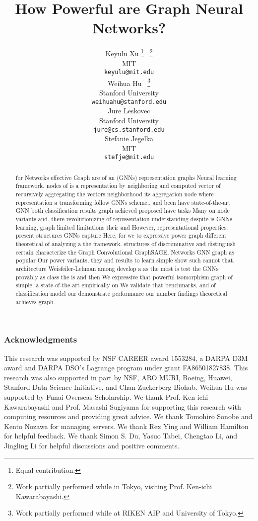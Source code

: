 \documentclass{article} %
\title{How Powerful are Graph Neural Networks?}
\author{Keyulu Xu  \thanks{Equal contribution.} \ \thanks{Work partially performed while in Tokyo, visiting Prof. Ken-ichi Kawarabayashi.} \\
MIT\\
\texttt{keyulu@mit.edu} \\
\And
Weihua Hu \footnotemark[1] \ \thanks{Work partially performed while at RIKEN AIP and University of Tokyo.} \\
Stanford University \\
\texttt{weihuahu@stanford.edu} \\
\And
Jure Leskovec\\
Stanford University \\
\texttt{jure@cs.stanford.edu}\\
\And
Stefanie Jegelka\\
MIT\\
\texttt{stefje@mit.edu} \\
}
\numberwithin{equation}{section}
\theoremstyle{plain}
\theoremstyle{definition}
\theoremstyle{remark}
\begin{document}
\maketitle

\begin{abstract}
for Networks effective Graph are of an (GNNs) representation graphs Neural learning framework. nodes of is a representation by neighboring and computed vector of recursively aggregating the  vectors neighborhood its aggregation node where representation a transforming follow GNNs scheme,. and been have state-of-the-art GNN both classification results graph achieved proposed have tasks Many on node  variants and. there revolutionizing of representation understanding despite is  GNNs learning, graph limited limitations their and However, representational properties. present structures GNNs capture Here, for we to expressive power graph different theoretical of  analyzing a the framework.  structures of discriminative and distinguish certain characterize the Graph Convolutional GraphSAGE, Networks GNN graph as popular Our power variants, they and results to learn simple show such cannot that. architecture Weisfeiler-Lehman among develop a as the most is test the GNNs provably as class the is and  then We expressive that powerful isomorphism graph of simple. a state-of-the-art empirically on We  validate that benchmarks, and of classification model our demonstrate performance our number findings theoretical achieves graph. \end{abstract}

















\subsubsection*{Acknowledgments}
This research was supported by NSF CAREER award 1553284, a DARPA D3M award and DARPA DSO’s Lagrange program under grant FA86501827838. This research was also supported in part by
NSF, ARO MURI, 
Boeing, Huawei, Stanford Data Science Initiative,
and Chan Zuckerberg Biohub. 
Weihua Hu was supported by Funai Overseas Scholarship. We thank Prof. Ken-ichi Kawarabayashi and Prof. Masashi Sugiyama for supporting this research with computing resources and providing great advice. We thank Tomohiro Sonobe and Kento Nozawa for managing servers. We thank Rex Ying and William Hamilton for helpful feedback. We thank Simon S. Du, Yasuo Tabei, Chengtao Li, and Jingling Li for helpful discussions and positive comments.






\end{document}
